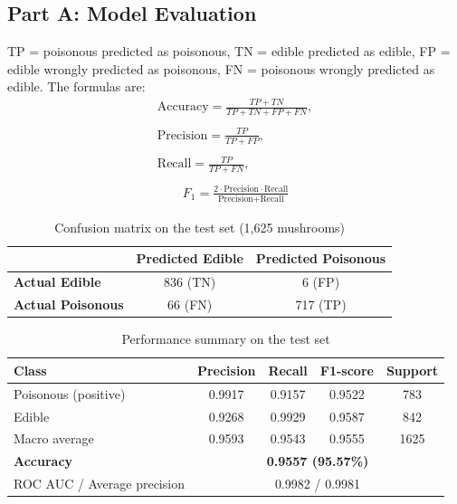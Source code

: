 \documentclass[12pt,a4paper]{article}
\begin{document}
\subsection{Part A: Model Evaluation}
TP = poisonous predicted as poisonous, TN = edible predicted as edible, FP = edible wrongly predicted as poisonous, FN = poisonous wrongly predicted as edible. The formulas are:
\begin{gather*}
\text{Accuracy}=\frac{TP+TN}{TP+TN+FP+FN}, \\ \qquad \\ \text{Precision}=\frac{TP}{TP+FP},\\ \\
\text{Recall}=\frac{TP}{TP+FN}, \\ \\ \qquad F_1=\frac{2\cdot \text{Precision}\cdot \text{Recall}}{\text{Precision}+\text{Recall}}
\end{gather*}

\begin{table}[H]
\centering
\caption{Confusion matrix on the test set (1,625 mushrooms)}
\begin{tabular}{lcc}
\toprule
 & \textbf{Predicted Edible} & \textbf{Predicted Poisonous}\\
\midrule
\textbf{Actual Edible} & 836 (TN) & 6 (FP)\\
\textbf{Actual Poisonous} & 66 (FN) & 717 (TP)\\
\bottomrule
\end{tabular}
\end{table}

\begin{table}[H]
\centering
\caption{Performance summary on the test set}
\begin{tabular}{lcccc}
\toprule
\textbf{Class} & \textbf{Precision} & \textbf{Recall} & \textbf{F1-score} & \textbf{Support}\\
\midrule
Poisonous (positive) & 0.9917 & 0.9157 & 0.9522 & 783\\
Edible & 0.9268 & 0.9929 & 0.9587 & 842\\
Macro average & 0.9593 & 0.9543 & 0.9555 & 1625\\
\midrule
\textbf{Accuracy} & \multicolumn{4}{c}{\textbf{0.9557 (95.57\%)}}\\
ROC AUC / Average precision & \multicolumn{4}{c}{0.9982 / 0.9981}\\
\bottomrule
\end{tabular}
\end{table}
\end{document}
